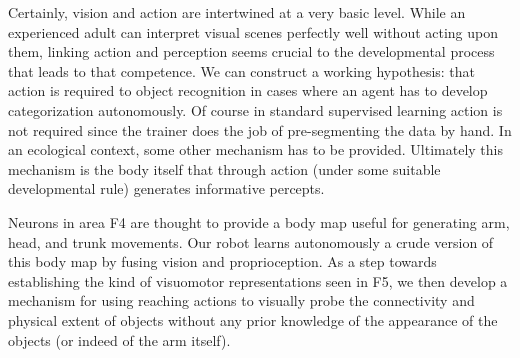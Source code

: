 Certainly, vision and action are intertwined at a very basic level.
While an
experienced adult can interpret visual scenes perfectly well without
acting upon them, linking action and perception seems crucial to the
developmental process that leads to that competence.  We can construct
a working hypothesis: that action is required to object recognition in
cases where an agent has to develop categorization autonomously.  Of
course in standard supervised learning action is not required since
the trainer does the job of pre-segmenting the data by hand.  In an
ecological context, some other mechanism has to be provided.
Ultimately this mechanism is the body itself that through action
(under some suitable developmental rule) generates informative
percepts.

Neurons in area F4 are thought to provide a body map useful for
generating arm, head, and trunk movements. Our robot learns
autonomously a crude version of this body map by fusing vision and
proprioception.  As a step towards establishing the kind of visuomotor
representations seen in F5, we then develop a mechanism for using
reaching actions to visually probe the connectivity and physical
extent of objects without any prior knowledge of the appearance of the
objects (or indeed of the arm itself).

\fi



